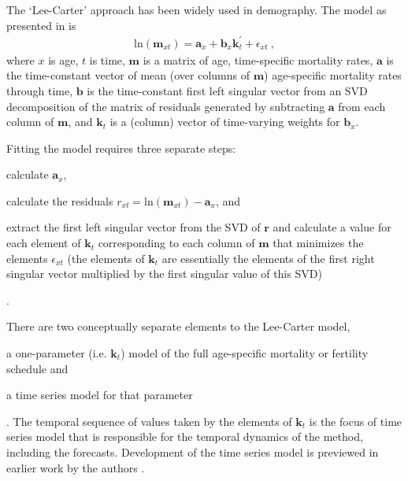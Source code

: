 \documentclass[11pt]{article}
\newcommand{\mbf}{\mathbf}
\begin{document}
The `Lee-Carter' approach \citep{lee1992modeling, lee1993modeling} has been widely used in demography.  The model as presented in \cite{lee1992modeling} is %
%
\begin{align}
\mbox{ln}(\mbf{m}_{xt}) = \mbf{a}_x + \mbf{b}_x\mbf{k}^{\prime}_t + \epsilon_{xt} \ , 
\label{eq:leeCarter}
\end{align} %
%
where $x$ is age, $t$ is time, $\mbf{m}$ is a matrix of age, time-specific mortality rates, $\mbf{a}$ is the time-constant vector of mean (over columns of $\mbf{m}$)  age-specific mortality rates through time, $\mbf{b}$ is the time-constant first left singular vector from an SVD decomposition of the matrix of residuals generated by subtracting $\mbf{a}$ from each column of $\mbf{m}$, and $\mbf{k}_t$ is a (column) vector of time-varying weights for $\mbf{b}_x$. 

Fitting the model requires three separate steps: 
\begin{enumerate*}[label=\arabic*)]
\item calculate $\mbf{a}_x$,
\item calculate the residuals $r_{xt} = \mbox{ln}(\mbf{m}_{xt}) - \mbf{a}_x$, and
\item \label{lc:last} extract the first left singular vector from the SVD of $\mbf{r}$ and calculate a value for each element of $\mbf{k}_t$ corresponding to each column of $\mbf{m}$ that minimizes the elements $\epsilon_{xt}$ (the elements of $\mbf{k}_t$ are essentially the elements of the first right singular vector multiplied by the first singular value of this SVD)
\end{enumerate*}.

There are two conceptually separate elements to the Lee-Carter model, 
\begin{enumerate*}[label=\arabic*)]
\item a one-parameter (i.e. $\mbf{k}_t$) model of the full age-specific mortality or fertility schedule and
\item a time series model for that parameter
\end{enumerate*}.
The temporal sequence of values taken by the elements of $\mbf{k}_t$ is the focus of  time series model that is responsible for the temporal dynamics of the method, including the forecasts.  Development of the time series model is previewed in earlier work by the authors \citep{carter1986joint}. 
\end{document}
